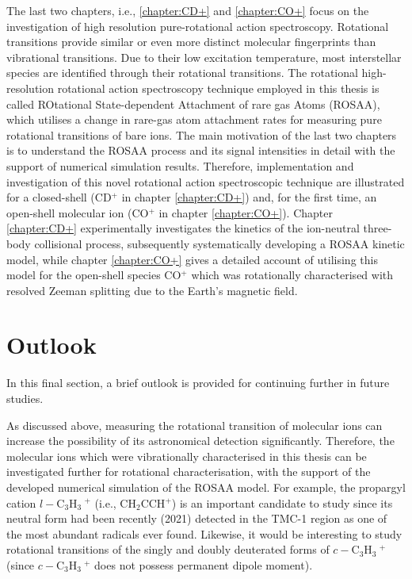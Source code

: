 The last two chapters, i.e., \ref{chapter:CD+} and \ref{chapter:CO+} focus on the investigation of high resolution pure-rotational action spectroscopy. Rotational transitions provide similar or even more distinct molecular fingerprints than vibrational transitions. Due to their low excitation temperature, most interstellar species are identified through their rotational transitions. The rotational high-resolution rotational action spectroscopy technique employed in this thesis is called ROtational State-dependent Attachment of rare gas Atoms (ROSAA), which utilises a change in rare-gas atom attachment rates for measuring pure rotational transitions of bare ions. The main motivation of the last two chapters is to understand the ROSAA process and its signal intensities in detail with the support of numerical simulation results. Therefore, implementation and investigation of this novel rotational action spectroscopic technique are illustrated for a closed-shell (CD$^+$ in chapter \ref{chapter:CD+}) and, for the first time, an open-shell molecular ion (CO$^+$ in chapter \ref{chapter:CO+}). Chapter \ref{chapter:CD+} experimentally investigates the kinetics of the ion-neutral three-body collisional process, subsequently systematically developing a ROSAA kinetic model, while chapter \ref{chapter:CO+} gives a detailed account of utilising this model for the open-shell species CO$^+$ which was rotationally characterised with resolved Zeeman splitting due to the Earth's magnetic field.
\section{Outlook}
In this final section, a brief outlook is provided for continuing further in future studies.

As discussed above, measuring the rotational transition of molecular ions can increase the possibility of its astronomical detection significantly. Therefore, the molecular ions which were vibrationally characterised in this thesis can be investigated further for rotational characterisation, with the support of the developed numerical simulation of the ROSAA model. For example, the propargyl cation $l-$C$_3$H$_3\ ^+$ (i.e., CH$_2$CCH$^+$) is an important candidate to study since its neutral form had been recently (2021) detected in the TMC-1 region as one of the most abundant radicals ever found. Likewise, it would be interesting to study rotational transitions of the singly and doubly deuterated forms of $c-$C$_3$H$_3\ ^+$ (since $c-$C$_3$H$_3\ ^+$ does not possess permanent dipole moment).

